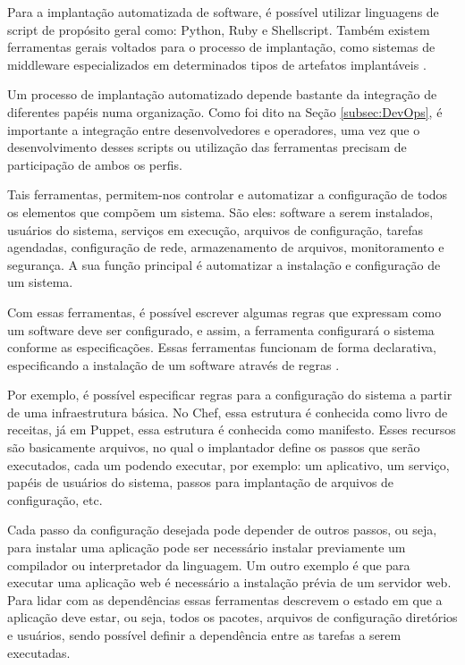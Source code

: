Para a implantação automatizada de software, é
possível utilizar linguagens de script de propósito
geral como: Python, Ruby e Shellscript. Também existem ferramentas gerais 
voltados para o processo de implantação, como sistemas de middleware 
especializados em determinados tipos de artefatos implantáveis \cite{leo2014}.

Um processo de implantação automatizado depende bastante da integração de diferentes papéis
numa organização. Como foi dito na Seção \ref{subsec:DevOps}, é importante a
integração entre desenvolvedores e operadores, uma vez que o desenvolvimento desses
scripts ou utilização das ferramentas precisam de participação de ambos os perfis.

Tais ferramentas, permitem-nos controlar e automatizar a configuração de todos os 
elementos que compõem um sistema. São eles: software a serem instalados,
usuários do sistema, serviços em execução, arquivos de configuração, tarefas agendadas,
configuração de rede, armazenamento de arquivos, monitoramento e segurança. A sua 
função principal é automatizar a instalação e configuração de um 
sistema. 

Com essas ferramentas, é possível escrever algumas regras que expressam como 
um software deve ser configurado, e assim, a ferramenta configurará o sistema conforme as 
especificações. Essas ferramentas funcionam de forma declarativa, 
especificando a instalação de um software através de regras \cite{6265084}.

Por exemplo, é possível especificar regras para a configuração do sistema
a partir de uma infraestrutura básica. No Chef, essa estrutura é conhecida como livro
de receitas, já em Puppet, essa estrutura é conhecida como manifesto. Esses recursos
são basicamente arquivos, no qual o implantador define os passos que serão executados,
cada um podendo executar, por exemplo: um aplicativo, um serviço, papéis de usuários do sistema,
passos para implantação de arquivos de configuração, etc.

Cada passo da configuração desejada pode depender de outros passos, ou seja, para
instalar uma aplicação pode ser necessário instalar previamente um compilador ou interpretador
 da linguagem. Um outro exemplo é que para executar uma aplicação web é necessário a 
instalação prévia de um servidor web. Para lidar com as dependências essas 
ferramentas descrevem o estado em que a aplicação deve estar, ou seja, 
todos os pacotes, arquivos de configuração diretórios e usuários, sendo possível 
definir a dependência entre as tarefas a serem executadas.

